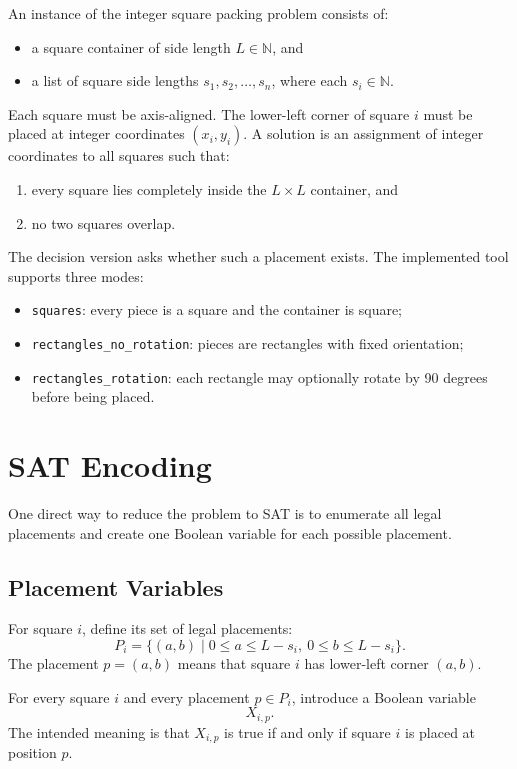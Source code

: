 \documentclass[11pt]{article}
\begin{document}
An instance of the integer square packing problem consists of:
\begin{itemize}
    \item a square container of side length \(L \in \mathbb{N}\), and
    \item a list of square side lengths \(s_1, s_2, \ldots, s_n\), where each
    \(s_i \in \mathbb{N}\).
\end{itemize}

Each square must be axis-aligned. The lower-left corner of square \(i\) must
be placed at integer coordinates \((x_i,y_i)\). A solution is an assignment of
integer coordinates to all squares such that:
\begin{enumerate}
    \item every square lies completely inside the \(L \times L\) container, and
    \item no two squares overlap.
\end{enumerate}

The decision version asks whether such a placement exists. The implemented
tool supports three modes:
\begin{itemize}
    \item \texttt{squares}: every piece is a square and the container is square;
    \item \texttt{rectangles\_no\_rotation}: pieces are rectangles with fixed
    orientation;
    \item \texttt{rectangles\_rotation}: each rectangle may optionally rotate by
    90 degrees before being placed.
\end{itemize}

\section{SAT Encoding}

One direct way to reduce the problem to SAT is to enumerate all legal
placements and create one Boolean variable for each possible placement.

\subsection{Placement Variables}

For square \(i\), define its set of legal placements:
\[
P_i = \{(a,b) \mid 0 \leq a \leq L-s_i,\ 0 \leq b \leq L-s_i\}.
\]
The placement \(p=(a,b)\) means that square \(i\) has lower-left corner
\((a,b)\).

For every square \(i\) and every placement \(p \in P_i\), introduce a Boolean
variable
\[
X_{i,p}.
\]
The intended meaning is that \(X_{i,p}\) is true if and only if square \(i\)
is placed at position \(p\).
\end{document}

